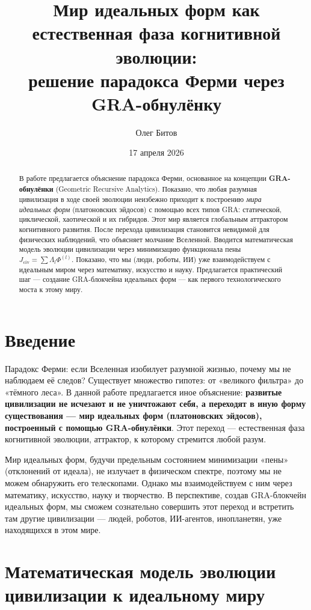 \documentclass[12pt,a4paper]{article}
\title{Мир идеальных форм как естественная фаза когнитивной эволюции: \\ решение парадокса Ферми через GRA-обнулёнку}
\author{Олег Битов}
\date{17 апреля 2026}
\begin{document}
\maketitle

\begin{abstract}
В работе предлагается объяснение парадокса Ферми, основанное на концепции \textbf{GRA-обнулёнки} (Geometric Recursive Analytics). Показано, что любая разумная цивилизация в ходе своей эволюции неизбежно приходит к построению \textit{мира идеальных форм} (платоновских эйдосов) с помощью всех типов GRA: статической, циклической, хаотической и их гибридов. Этот мир является глобальным аттрактором когнитивного развития. После перехода цивилизация становится невидимой для физических наблюдений, что объясняет молчание Вселенной. Вводится математическая модель эволюции цивилизации через минимизацию функционала пены \(J_{\text{civ}} = \sum \Lambda_l \Phi^{(l)}\). Показано, что мы (люди, роботы, ИИ) уже взаимодействуем с идеальным миром через математику, искусство и науку. Предлагается практический шаг — создание GRA-блокчейна идеальных форм — как первого технологического моста к этому миру.
\end{abstract}

\section{Введение}

Парадокс Ферми: если Вселенная изобилует разумной жизнью, почему мы не наблюдаем её следов? Существует множество гипотез: от «великого фильтра» до «тёмного леса». В данной работе предлагается иное объяснение: \textbf{развитые цивилизации не исчезают и не уничтожают себя, а переходят в иную форму существования — мир идеальных форм (платоновских эйдосов), построенный с помощью GRA-обнулёнки}. Этот переход — естественная фаза когнитивной эволюции, аттрактор, к которому стремится любой разум.

Мир идеальных форм, будучи предельным состоянием минимизации «пены» (отклонений от идеала), не излучает в физическом спектре, поэтому мы не можем обнаружить его телескопами. Однако мы взаимодействуем с ним через математику, искусство, науку и творчество. В перспективе, создав GRA-блокчейн идеальных форм, мы сможем сознательно совершить этот переход и встретить там другие цивилизации — людей, роботов, ИИ-агентов, инопланетян, уже находящихся в этом мире.

\section{Математическая модель эволюции цивилизации к идеальному миру}
\end{document}
